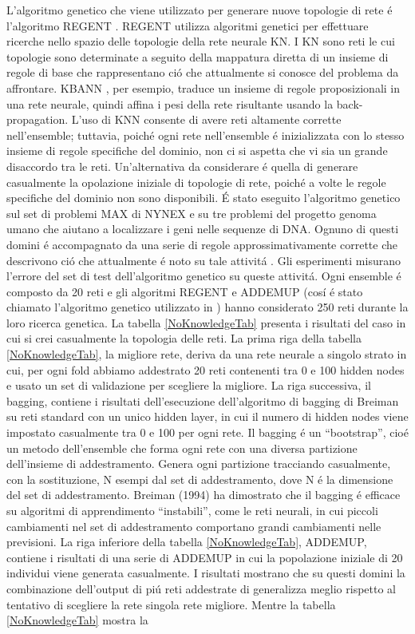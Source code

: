 \documentclass[a4paper,10pt]{article}
\begin{document}
  L'algoritmo genetico che viene utilizzato per generare nuove topologie di rete \'e l'algoritmo REGENT \cite{opitz1994using}. REGENT utilizza algoritmi genetici per effettuare ricerche nello spazio delle topologie della rete neurale KN. I KN sono reti le cui topologie sono determinate a seguito della mappatura diretta di un insieme di regole di base che rappresentano ci\'o che attualmente si conosce del problema da affrontare. KBANN \cite{towell1994knowledge}, per esempio, traduce un insieme di regole proposizionali in una rete neurale, quindi affina i pesi della rete risultante usando la back-propagation. L'uso di KNN consente di avere reti altamente corrette nell'ensemble; tuttavia, poich\'e ogni rete nell'ensemble \'e inizializzata con lo stesso insieme di regole specifiche del dominio, non ci si aspetta che vi sia un grande disaccordo tra le reti. Un'alternativa da considerare \'e quella di generare casualmente la opolazione iniziale di topologie di rete, poich\'e a volte le regole specifiche del dominio non sono disponibili. \'E stato eseguito l'algoritmo genetico sul set di problemi MAX di NYNEX e su tre problemi del progetto genoma umano che aiutano a localizzare i geni nelle sequenze di DNA. Ognuno di questi domini \'e accompagnato da una serie di regole approssimativamente corrette che descrivono ci\'o che attualmente \'e noto su tale attivit\'a \cite{opitz1995anytime} \cite{opitz1994using}. Gli esperimenti misurano l'errore del set di test dell'algoritmo genetico su queste attivit\'a. Ogni ensemble \'e composto da 20 reti e gli algoritmi REGENT e ADDEMUP (cos\'i \'e stato chiamato l'algoritmo genetico utilizzato in \cite{opitz1996generating}) hanno considerato 250 reti durante la loro ricerca genetica. La tabella \ref{NoKnowledgeTab} presenta i risultati del caso in cui si crei casualmente la topologia delle reti. La prima riga della tabella \ref{NoKnowledgeTab}, la migliore rete, deriva da una rete neurale a singolo strato in cui, per ogni fold abbiamo addestrato 20 reti contenenti tra 0 e 100 hidden nodes e usato un set di validazione per scegliere la migliore. La riga successiva, il bagging, contiene i risultati dell'esecuzione dell'algoritmo di bagging di Breiman \cite{breiman1994bagging} su reti standard con un unico hidden layer, in cui il numero di hidden nodes viene impostato casualmente tra 0 e 100 per ogni rete. Il bagging \'e un ``bootstrap'', cio\'e un metodo dell'ensemble che forma ogni rete con una diversa partizione dell'insieme di addestramento. Genera ogni partizione tracciando casualmente, con la sostituzione, N esempi dal set di addestramento, dove N \'e la dimensione del set di addestramento. Breiman (1994) \cite{breiman1994bagging} ha dimostrato che il bagging \'e efficace su algoritmi di apprendimento ``instabili'', come le reti neurali, in cui piccoli cambiamenti nel set di addestramento comportano grandi cambiamenti nelle previsioni. La riga inferiore della tabella \ref{NoKnowledgeTab}, ADDEMUP, contiene i risultati di una serie di ADDEMUP in cui la popolazione iniziale di 20 individui viene generata casualmente. I risultati mostrano che su questi domini la combinazione dell'output di pi\'u reti addestrate di generalizza meglio rispetto al tentativo di scegliere la rete singola rete migliore. Mentre la tabella \ref{NoKnowledgeTab} mostra la 
\end{document}
